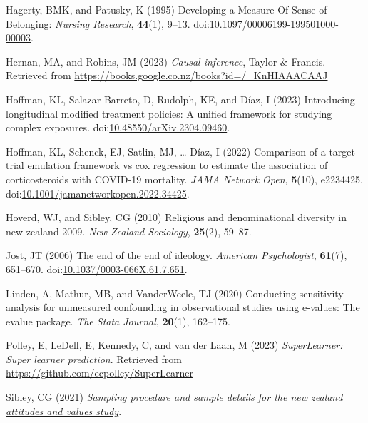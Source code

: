 \documentclass[
  singlecolumn]{article}
\newlength{\cslhangindent}
\newenvironment{CSLReferences}[2] %
 {\begin{list}{}{%
  \setlength{\itemindent}{0pt}
  \setlength{\leftmargin}{0pt}
  \setlength{\parsep}{0pt}
  \ifodd #1
   \setlength{\leftmargin}{\cslhangindent}
   \setlength{\itemindent}{-1\cslhangindent}
  \fi
  \setlength{\itemsep}{#2\baselineskip}}}
 {\end{list}}
\begin{document}
\begin{CSLReferences}{1}{0}
Hagerty, BMK, and Patusky, K (1995) Developing a Measure Of Sense of
Belonging: \emph{Nursing Research}, \textbf{44}(1), 9--13.
doi:\href{https://doi.org/10.1097/00006199-199501000-00003}{10.1097/00006199-199501000-00003}.

Hernan, MA, and Robins, JM (2023) \emph{Causal inference}, Taylor \&
Francis. Retrieved from
\url{https://books.google.co.nz/books?id=/_KnHIAAACAAJ}

Hoffman, KL, Salazar-Barreto, D, Rudolph, KE, and Díaz, I (2023)
Introducing longitudinal modified treatment policies: A unified
framework for studying complex exposures.
doi:\href{https://doi.org/10.48550/arXiv.2304.09460}{10.48550/arXiv.2304.09460}.

Hoffman, KL, Schenck, EJ, Satlin, MJ, \ldots{} Díaz, I (2022) Comparison
of a target trial emulation framework vs cox regression to estimate the
association of corticosteroids with COVID-19 mortality. \emph{JAMA
Network Open}, \textbf{5}(10), e2234425.
doi:\href{https://doi.org/10.1001/jamanetworkopen.2022.34425}{10.1001/jamanetworkopen.2022.34425}.

Hoverd, WJ, and Sibley, CG (2010) Religious and denominational diversity
in new zealand 2009. \emph{New Zealand Sociology}, \textbf{25}(2),
59--87.

Jost, JT (2006) The end of the end of ideology. \emph{American
Psychologist}, \textbf{61}(7), 651--670.
doi:\href{https://doi.org/10.1037/0003-066X.61.7.651}{10.1037/0003-066X.61.7.651}.

Linden, A, Mathur, MB, and VanderWeele, TJ (2020) Conducting sensitivity
analysis for unmeasured confounding in observational studies using
e-values: The evalue package. \emph{The Stata Journal}, \textbf{20}(1),
162--175.

Polley, E, LeDell, E, Kennedy, C, and van der Laan, M (2023)
\emph{SuperLearner: Super learner prediction}. Retrieved from
\url{https://github.com/ecpolley/SuperLearner}

Sibley, CG (2021)
\emph{\href{https://doi.org/10.31234/osf.io/wgqvy}{Sampling procedure
and sample details for the new zealand attitudes and values study}}.


\end{CSLReferences}
\end{document}
